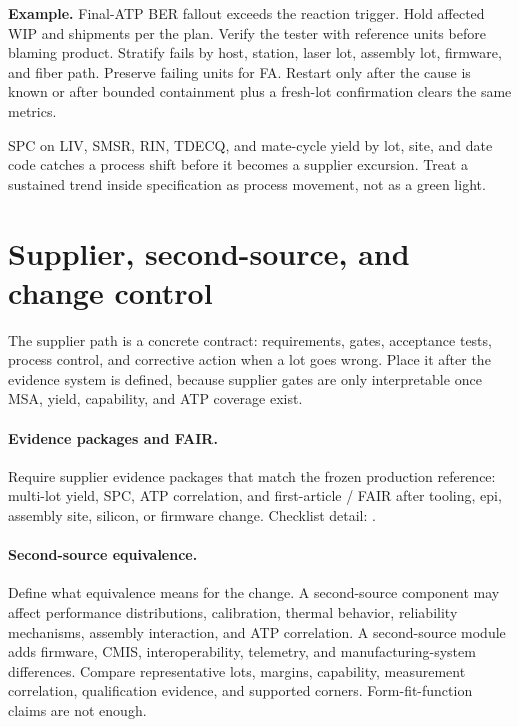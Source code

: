 \textbf{Example.} Final-ATP BER fallout exceeds the reaction trigger. Hold
affected WIP and shipments per the plan. Verify the tester with reference units
before blaming product. Stratify fails by host, station, laser lot, assembly
lot, firmware, and fiber path. Preserve failing units for FA. Restart only after
the cause is known or after bounded containment plus a fresh-lot confirmation
clears the same metrics.

SPC on LIV, SMSR, RIN, TDECQ, and mate-cycle yield by lot, site, and date code
catches a process shift before it becomes a supplier excursion. Treat a
sustained trend inside specification as process movement, not as a green light.

\section{Supplier, second-source, and change control}
\label{sec:supplier-exec}

The supplier path is a concrete contract: requirements, gates, acceptance
tests, process control, and corrective action when a lot goes wrong. Place it
after the evidence system is defined, because supplier gates are only
interpretable once MSA, yield, capability, and ATP coverage exist.




\paragraph{Evidence packages and FAIR.}
Require supplier evidence packages that match the frozen production reference:
multi-lot yield, SPC, ATP correlation, and first-article / FAIR after tooling,
epi, assembly site, silicon, or firmware change. Checklist detail:
.

\paragraph{Second-source equivalence.}
Define what equivalence means for the change. A second-source component may
affect performance distributions, calibration, thermal behavior, reliability
mechanisms, assembly interaction, and ATP correlation. A second-source module
adds firmware, CMIS, interoperability, telemetry, and manufacturing-system
differences. Compare representative lots, margins, capability, measurement
correlation, qualification evidence, and supported corners. Form-fit-function
claims are not enough.

